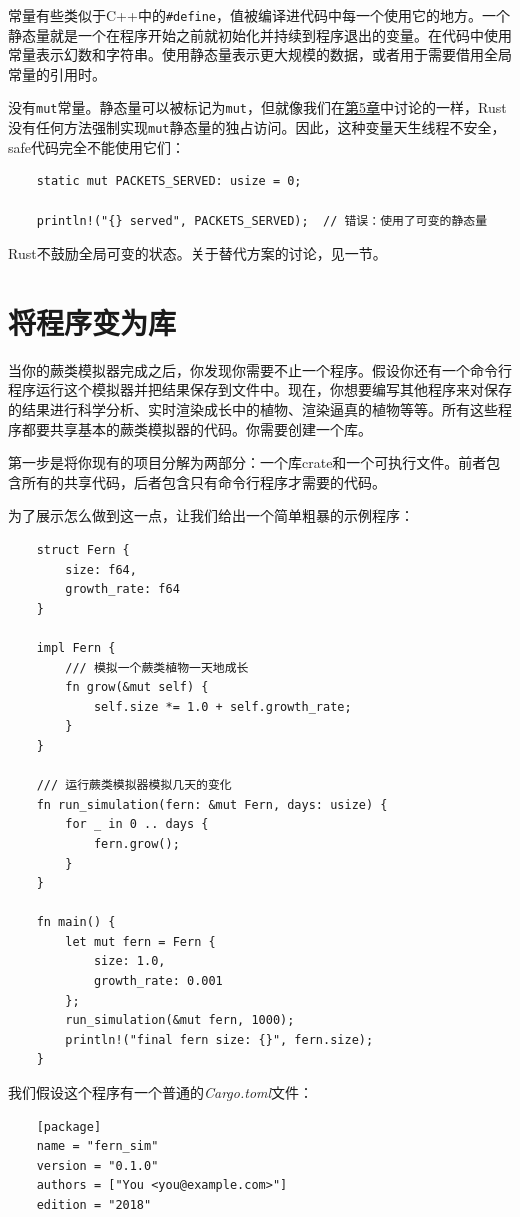 常量有些类似于C++中的\texttt{\#define}，值被编译进代码中每一个使用它的地方。一个静态量就是一个在程序开始之前就初始化并持续到程序退出的变量。在代码中使用常量表示幻数和字符串。使用静态量表示更大规模的数据，或者用于需要借用全局常量的引用时。

没有\texttt{mut}常量。静态量可以被标记为\texttt{mut}，但就像我们在\hyperref[ch05]{第5章}中讨论的一样，Rust没有任何方法强制实现\texttt{mut}静态量的独占访问。因此，这种变量天生线程不安全，safe代码完全不能使用它们：
\begin{verbatim}
    static mut PACKETS_SERVED: usize = 0;

    println!("{} served", PACKETS_SERVED);  // 错误：使用了可变的静态量
\end{verbatim}

Rust不鼓励全局可变的状态。关于替代方案的讨论，见一节。

\section{将程序变为库}

当你的蕨类模拟器完成之后，你发现你需要不止一个程序。假设你还有一个命令行程序运行这个模拟器并把结果保存到文件中。现在，你想要编写其他程序来对保存的结果进行科学分析、实时渲染成长中的植物、渲染逼真的植物等等。所有这些程序都要共享基本的蕨类模拟器的代码。你需要创建一个库。

第一步是将你现有的项目分解为两部分：一个库crate和一个可执行文件。前者包含所有的共享代码，后者包含只有命令行程序才需要的代码。

为了展示怎么做到这一点，让我们给出一个简单粗暴的示例程序：
\begin{verbatim}
    struct Fern {
        size: f64,
        growth_rate: f64
    }

    impl Fern {
        /// 模拟一个蕨类植物一天地成长
        fn grow(&mut self) {
            self.size *= 1.0 + self.growth_rate;
        }
    }

    /// 运行蕨类模拟器模拟几天的变化
    fn run_simulation(fern: &mut Fern, days: usize) {
        for _ in 0 .. days {
            fern.grow();
        }
    }

    fn main() {
        let mut fern = Fern {
            size: 1.0,
            growth_rate: 0.001
        };
        run_simulation(&mut fern, 1000);
        println!("final fern size: {}", fern.size);
    }
\end{verbatim}

我们假设这个程序有一个普通的\emph{Cargo.toml}文件：
\begin{verbatim}
    [package]
    name = "fern_sim"
    version = "0.1.0"
    authors = ["You <you@example.com>"]
    edition = "2018"
\end{verbatim}

